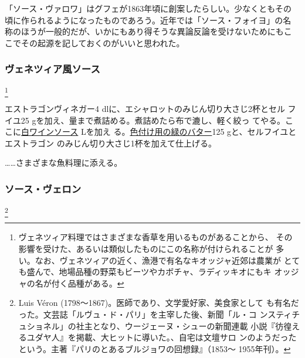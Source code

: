 \begin{recette}
「ソース・ヴァロワ」はグフェが1863年頃に創案したらしい。少なくともその
頃に作られるようになったものであろう。近年では「ソース・フォイヨ」の名
称のほうが一般的だが、いかにもあり得そうな異論反論を受けないためにもこ
こでその起源を記しておくのがいいと思われた。

\maeaki

\hypertarget{sauce-venitienne}{%
\subsubsection{ヴェネツィア風ソース}\label{sauce-venitienne}}

\footnote{ヴェネツィア料理ではさまざまな香草を用いるものがあることから、
  その影響を受けた、あるいは類似したものにこの名称が付けられることが
  多い。なお、ヴェネツィアの近く、漁港で有名なキオッジャ近郊は農業が
  とても盛んで、地場品種の野菜もビーツやカボチャ、ラディッキオにもキ
  オッジャの名が付く品種がある。}


エストラゴンヴィネガー4 dlに、エシャロットのみじん切り大さじ2杯とセル
フイユ25 gを加え、\untiers{}量まで煮詰める。煮詰めたら布で漉し、軽く絞っ
てやる。ここに\protect\hyperlink{sauce-vin-blanc}{白ワインソース}\troisquarts{}
Lを加え
る。\protect\hyperlink{beurre-colorant-vert}{色付け用の緑のバター}125
gと、セルフイユとエストラゴン のみじん切り大さじ1杯を加えて仕上げる。

\ldots{}\ldots{}さまざまな魚料理に添える。

\maeaki

\hypertarget{sauce-veron}{%
\subsubsection{ソース・ヴェロン}\label{sauce-veron}}

\footnote{Luis Véron
  (1798〜1867)。医師であり、文学愛好家、美食家として
  も有名だった。文芸誌「ルヴュ・ド・パリ」を主宰した後、新聞「ル・コ
  ンスティチュショネル」の社主となり、ウージェーヌ・シューの新聞連載
  小説『彷徨えるユダヤ人』を掲載、大ヒットに導いた。、自宅は文壇サロ
  ンのようだったという。主著『パリのとあるブルジョワの回想録』（1853〜
  1955年刊）。}


\end{recette}
